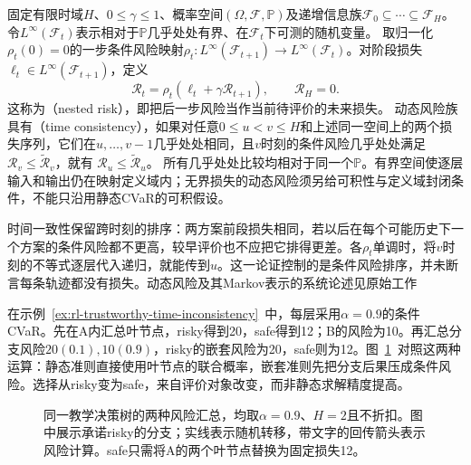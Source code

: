 \begin{definition}[嵌套风险与时间一致性]
  \label{def:rl-trustworthy-time-consistency}
  固定有限时域$H$、$0\leq\gamma\leq1$、概率空间$(\Omega,\mathcal F,\mathbb P)$及递增信息族$\mathcal F_0\subseteq\cdots\subseteq\mathcal F_H$。令$L^\infty(\mathcal F_t)$表示相对于$\mathbb P$几乎处处有界、在$\mathcal F_t$下可测的随机变量。
  取归一化$\rho_t(0)=0$的一步条件风险映射$\rho_t:L^\infty(\mathcal F_{t+1})\to L^\infty(\mathcal F_t)$。对阶段损失$\ell_t\in L^\infty(\mathcal F_{t+1})$，定义
  \[
    \mathcal R_t
      =\rho_t(\ell_t+\gamma\mathcal R_{t+1}),
      \qquad \mathcal R_H=0.
  \]
  这称为（nested risk），即把后一步风险当作当前待评价的未来损失。
  动态风险族具有（time consistency），如果对任意$0\leq u<v\leq H$和上述同一空间上的两个损失序列，它们在$u,\ldots,v-1$几乎处处相同，且$v$时刻的条件风险几乎处处满足$\mathcal R_v\leq\widetilde{\mathcal R}_v$，就有
  $\mathcal R_u\leq\widetilde{\mathcal R}_u$。
  所有几乎处处比较均相对于同一个$\mathbb P$。有界空间使逐层输入和输出仍在映射定义域内；无界损失的动态风险须另给可积性与定义域封闭条件，不能只沿用静态CVaR的可积假设。
\end{definition}

时间一致性保留跨时刻的排序：两方案前段损失相同，若以后在每个可能历史下一个方案的条件风险都不更高，较早评价也不应把它排得更差。各$\rho_t$单调时，将$v$时刻的不等式逐层代入递归，就能传到$u$。这一论证控制的是条件风险排序，并未断言每条轨迹都没有损失。动态风险及其Markov表示的系统论述见原始工作

在示例~\ref{ex:rl-trustworthy-time-inconsistency}~中，每层采用$\alpha=0.9$的条件CVaR。先在A内汇总叶节点，risky得到20，safe得到12；B的风险为10。再汇总分支风险$20(0.1),10(0.9)$，risky的嵌套风险为20，safe则为12。图~\ref{fig:rl-trustworthy-risk-tree}~对照这两种运算：静态准则直接使用叶节点的联合概率，嵌套准则先把分支后果压成条件风险。选择从risky变为safe，来自评价对象改变，而非静态求解精度提高。

\begin{figure}[t]
  \centering
  
  \caption{同一教学决策树的两种风险汇总，均取$\alpha=0.9$、$H=2$且不折扣。图中展示承诺risky的分支；实线表示随机转移，带文字的回传箭头表示风险计算。safe只需将A的两个叶节点替换为固定损失12。}
  \label{fig:rl-trustworthy-risk-tree}
\end{figure}

